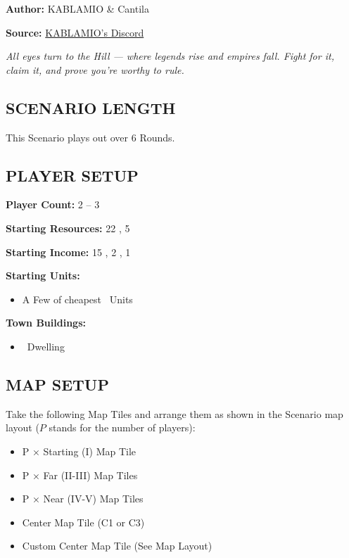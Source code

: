 
\begin{multicols}{2}

\textbf{Author:} KABLAMIO \& Cantila

\textbf{Source:} \href{https://discord.com/channels/1275490124301467799/1284428969369665631}{KABLAMIO's Discord}

\textit{All eyes turn to the Hill — where legends rise and empires fall. Fight for it, claim it, and prove you’re worthy to rule.}

\subsection*{\MakeUppercase{Scenario Length}}
This Scenario plays out over 6 Rounds.

\subsection*{\MakeUppercase{Player Setup}}
\textbf{Player Count:} 2 -- 3

\textbf{Starting Resources:} 22 , 5 

\textbf{Starting Income:} 15 , 2 , 1 

\textbf{Starting Units:}
\begin{itemize}
  \item A Few of cheapest \silver\ Units
\end{itemize}

\textbf{Town Buildings:}
\begin{itemize}
  \item \bronze\ Dwelling
\end{itemize}

\subsection*{\MakeUppercase{Map Setup}}
Take the following Map Tiles and arrange them as shown in the Scenario map layout ($P$ stands for the number of players):

\begin{itemize}
  \item P × Starting (I) Map Tile
  \item P × Far (II-III) Map Tiles
  \item P × Near (IV-V) Map Tiles
  \item Center Map Tile (C1 or C3)
  \item Custom Center Map Tile (See Map Layout)
\end{itemize}


\end{multicols}
